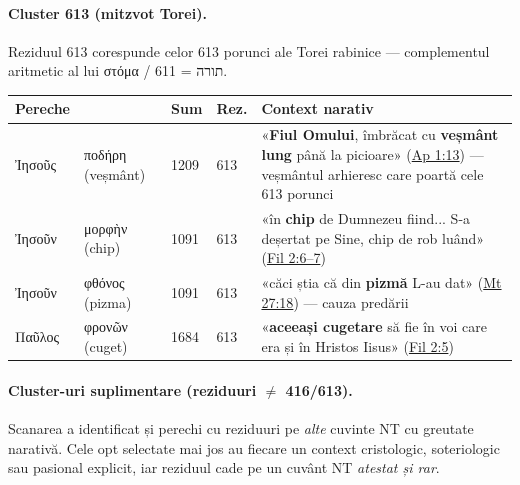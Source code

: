 \documentclass[12pt,a4paper,twoside,openany]{book}
\begin{document}
\paragraph*{Cluster 613 (mitzvot Torei).} Reziduul 613 corespunde celor 613 porunci ale Torei rabinice --- complementul aritmetic al lui στόμα / תורה = 611.

\begin{center}
\footnotesize
\begin{tabular}{L{3.2cm}L{3.2cm}C{1.2cm}C{1.2cm}L{4.5cm}}
\toprule
{}
\textbf{Pereche} & & \textbf{Sum} & \textbf{Rez.} & \textbf{Context narativ} \\
\midrule
Ἰησοῦς & ποδήρη (veșmânt) & 1209 & 613 & «\textbf{Fiul Omului}, îmbrăcat cu \textbf{veșmânt lung} până la picioare» (\href{https://bibliaortodoxa.ro/carte.php?id=78\&cap=1\#13}{Ap 1:13}) --- veșmântul arhieresc care poartă cele 613 porunci \\
Ἰησοῦν & μορφὴν (chip) & 1091 & 613 & «în \textbf{chip} de Dumnezeu fiind... S-a deșertat pe Sine, chip de rob luând» (\href{https://bibliaortodoxa.ro/carte.php?id=57\&cap=2\#6}{Fil 2:6--7}) \\
Ἰησοῦν & φθόνος (pizma) & 1091 & 613 & «căci știa că din \textbf{pizmă} L-au dat» (\href{https://bibliaortodoxa.ro/carte.php?id=55\&cap=27\#18}{Mt 27:18}) --- cauza predării \\
Παῦλος & φρονῶν (cuget) & 1684 & 613 & «\textbf{aceeași cugetare} să fie în voi care era și în Hristos Iisus» (\href{https://bibliaortodoxa.ro/carte.php?id=57\&cap=2\#5}{Fil 2:5}) \\
\bottomrule
\end{tabular}
\end{center}

\paragraph*{Cluster-uri suplimentare (reziduuri $\neq$ 416/613).} Scanarea a identificat și perechi cu reziduuri pe \textit{alte} cuvinte NT cu greutate narativă. Cele opt selectate mai jos au fiecare un context cristologic, soteriologic sau pasional explicit, iar reziduul cade pe un cuvânt NT \textit{atestat și rar}.
\end{document}
